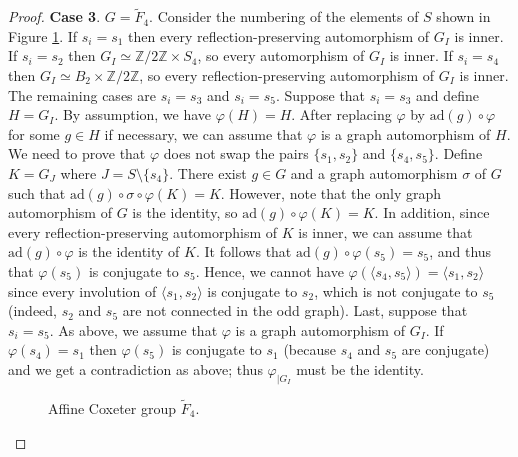\documentclass[a4paper, 11pt]{amsart}
\theoremstyle{definition}
\theoremstyle{remark}
\begin{document}
\begin{proof}
\medskip
\noindent \textbf{Case 3}. $G=\tilde{F}_4$. 
\newline Consider the numbering of the elements of $S$ shown in Figure \ref{F4}. If $s_i=s_1$ then every reflection-preserving automorphism of $G_I$ is inner. If $s_i=s_2$ then $G_I\simeq \mathbb{Z}/2\mathbb{Z}\times S_4$, so every automorphism of $G_I$ is inner. If $s_i=s_4$ then $G_I\simeq B_2  \times \mathbb{Z}/2\mathbb{Z}$, so every reflection-preserving automorphism of $G_I$ is inner. The remaining cases are $s_i=s_3$ and $s_i=s_5$. Suppose that $s_i=s_3$ and define $H=G_I$. By assumption, we have $\varphi(H)=H$. After replacing $\varphi$ by $\mathrm{ad}(g)\circ \varphi$ for some $g\in H$ if necessary, we can assume that $\varphi$ is a graph automorphism of $H$. We need to prove that $\varphi$ does not swap the pairs $\lbrace s_1,s_2\rbrace$ and $\lbrace s_4,s_5\rbrace$. Define $K=G_J$ where $J=S\setminus \lbrace s_4\rbrace$. There exist $g\in G$ and a graph automorphism $\sigma$ of $G$ such that $\mathrm{ad}(g)\circ\sigma\circ \varphi(K)=K$. However, note that the only graph automorphism of $G$ is the identity, so $\mathrm{ad}(g)\circ \varphi(K)=K$. In addition, since every reflection-preserving automorphism of $K$ is inner, we can assume that $\mathrm{ad}(g)\circ \varphi$ is the identity of $K$. It follows that $\mathrm{ad}(g)\circ \varphi(s_5)=s_5$, and thus that $\varphi(s_5)$ is conjugate to $s_5$. Hence, we cannot have $\varphi(\langle s_4,s_5\rangle)=\langle s_1,s_2\rangle$ since every involution of $\langle s_1,s_2\rangle$ is conjugate to $s_2$, which is not conjugate to $s_5$ (indeed, $s_2$ and $s_5$ are not connected in the odd graph). Last, suppose that $s_i=s_5$. As above, we assume that $\varphi$ is a graph automorphism of $G_I$. If $\varphi(s_4)=s_1$ then $\varphi(s_5)$ is conjugate to $s_1$ (because $s_4$ and $s_5$ are conjugate) and we get a contradiction as above; thus $\varphi_{\vert G_I}$ must be the identity.


\begin{figure}[h!]
  \centering
  \caption{Affine Coxeter group $\tilde{F}_4$.}
  \label{F4}
\end{figure}


\end{proof}
\end{document}
